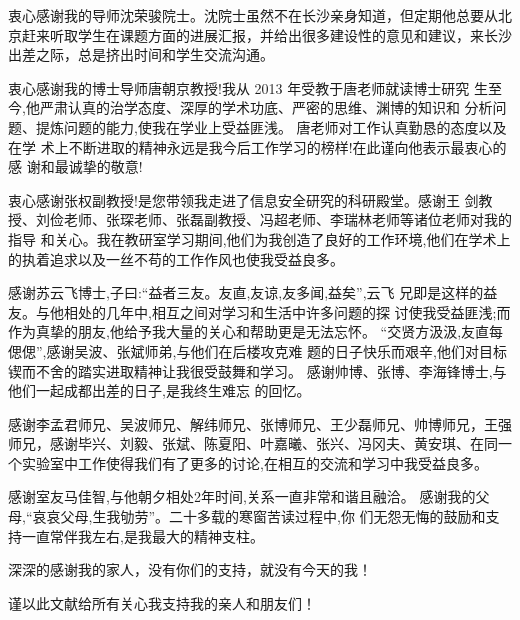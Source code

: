 

\begin{ack}
  
  衷心感谢我的导师沈荣骏院士。沈院士虽然不在长沙亲身知道，但定期他总要从北京赶来听取学生在课题方面的进展汇报，并给出很多建设性的意见和建议，来长沙出差之际，总是挤出时间和学生交流沟通。
  
  衷心感谢我的博士导师唐朝京教授!我从 2013 年受教于唐老师就读博士研究
  生至今,他严肃认真的治学态度、深厚的学术功底、严密的思维、渊博的知识和
  分析问题、提炼问题的能力,使我在学业上受益匪浅。
  唐老师对工作认真勤恳的态度以及在学
  术上不断进取的精神永远是我今后工作学习的榜样!在此谨向他表示最衷心的感
  谢和最诚挚的敬意!
  
  衷心感谢张权副教授!是您带领我走进了信息安全研究的科研殿堂。感谢王
  剑教授、刘俭老师、张琛老师、张磊副教授、冯超老师、李瑞林老师等诸位老师对我的指导
  和关心。我在教研室学习期间,他们为我创造了良好的工作环境,他们在学术上
  的执着追求以及一丝不苟的工作作风也使我受益良多。
  
  感谢苏云飞博士,子曰:“益者三友。友直,友谅,友多闻,益矣”,云飞
  兄即是这样的益友。与他相处的几年中,相互之间对学习和生活中许多问题的探
  讨使我受益匪浅;而作为真挚的朋友,他给予我大量的关心和帮助更是无法忘怀。
  “交贤方汲汲,友直每偲偲”,感谢吴波、张斌师弟,与他们在后楼攻克难
  题的日子快乐而艰辛,他们对目标锲而不舍的踏实进取精神让我很受鼓舞和学习。
  感谢帅博、张博、李海锋博士,与他们一起成都出差的日子,是我终生难忘
  的回忆。
  
  感谢李孟君师兄、吴波师兄、解纬师兄、张博师兄、王少磊师兄、帅博师兄，王强师兄，感谢毕兴、刘毅、张斌、陈夏阳、叶嘉曦、张兴、冯冈夫、黄安琪、在同一个实验室中工作使得我们有了更多的讨论,在相互的交流和学习中我受益良多。
  
  感谢室友马佳智,与他朝夕相处2年时间,关系一直非常和谐且融洽。
  感谢我的父母,“哀哀父母,生我劬劳”。二十多载的寒窗苦读过程中,你
  们无怨无悔的鼓励和支持一直常伴我左右,是我最大的精神支柱。
  
  深深的感谢我的家人，没有你们的支持，就没有今天的我！
  
  谨以此文献给所有关心我支持我的亲人和朋友们！

\end{ack}

